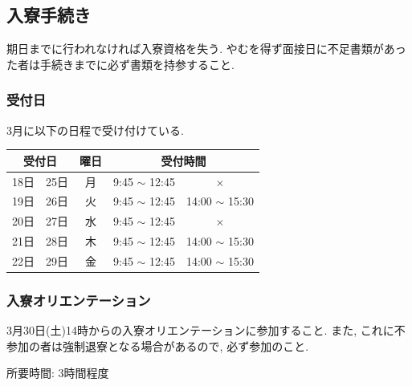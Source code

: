 \documentclass[10pt,b5jsbook,dvips,dvipdfmx,openany]{jsbook}
\theoremstyle{definition}
\begin{document}
		\subsection{入寮手続き}
		期日までに行われなければ入寮資格を失う. やむを得ず面接日に不足書類があった者は手続きまでに必ず書類を持参すること.
			\subsubsection{受付日}  3月に以下の日程で受け付けている. %
			\begin{table}[h]
\begin{tabular}{|l|l|c|l|c|}
\hline
\multicolumn{2}{|c|}{受付日} & 曜日  & \multicolumn{2}{|c|}{受付時間}                  \\ \hline \hline
18日         & 25日        & 月 & 9:45 $ \sim $ 12:45 & $ \times $           \\ \hline
19日         & 26日        & 火 & 9:45 $ \sim $ 12:45 & 14:00 $ \sim $ 15:30 \\ \hline
20日         & 27日        & 水 & 9:45 $ \sim $ 12:45 & $ \times $           \\ \hline
21日         & 28日        & 木 & 9:45 $ \sim $ 12:45 & 14:00 $ \sim $ 15:30 \\ \hline
22日         & 29日        & 金 & 9:45 $ \sim $ 12:45 & 14:00 $ \sim $ 15:30 \\ \hline
\end{tabular}
\end{table}
\subsubsection{入寮オリエンテーション}
			3月30日(土)14時からの入寮オリエンテーションに参加すること. また, これに不参加の者は強制退寮となる場合があるので, 必ず参加のこと.

			所要時間: 3時間程度


\end{document}
